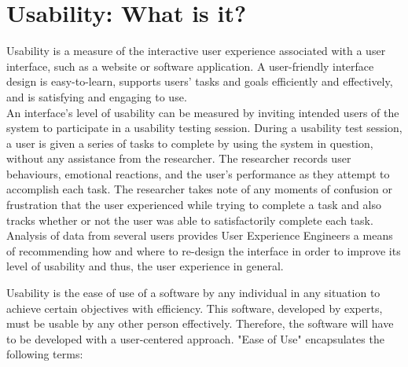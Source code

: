 \section{Usability: What is it?}

Usability is a measure of the interactive user experience associated with a user interface, such as a website or software application. A user-friendly interface design is easy-to-learn, supports users' tasks and goals efficiently and effectively, and is satisfying and engaging to use.\\

An interface's level of usability can be measured by inviting intended users of the system to participate in a usability testing session. During a usability test session, a user is given a series of tasks to complete by using the system in question, without any assistance from the researcher. The researcher records user behaviours, emotional reactions, and the user's performance as they attempt to accomplish each task. The researcher takes note of any moments of confusion or frustration that the user experienced while trying to complete a task and also tracks whether or not the user was able to satisfactorily complete each task. Analysis of data from several users provides User Experience Engineers a means of recommending how and where to re-design the interface in order to improve its level of usability and thus, the user experience in general.

\smallskip

Usability is the ease of use of a software by any individual in any situation to achieve certain objectives with efficiency. This software, developed by experts, must be usable by any other person effectively. Therefore, the software will have to be developed with a user-centered approach. "Ease of Use" encapsulates the following terms:

